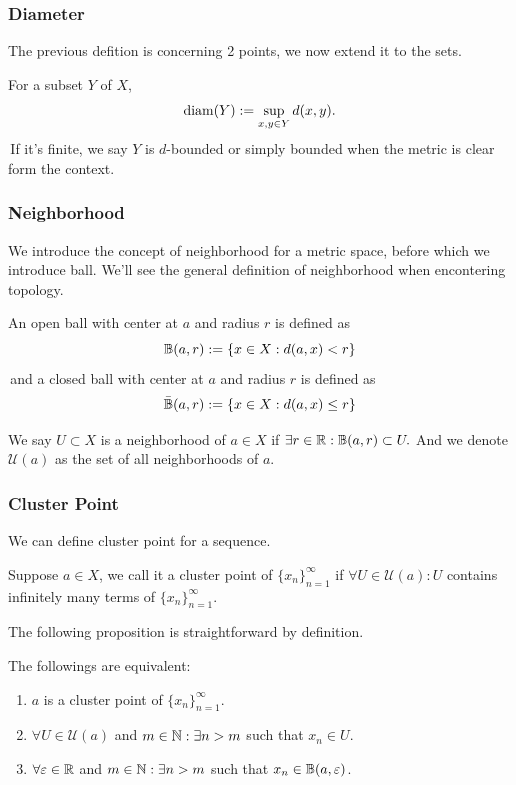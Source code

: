 \subsubsection{Diameter}
The previous defition is concerning 2 points, we now extend it to the sets.
\begin{definition}[Diameter]
    For a subset $Y$ of $X$,
    $$\operatorname{diam}(Y) := \sup_{x,y \in Y} d(x,y).$$
    \,If it's finite, we say $Y$ is $d$-bounded or simply bounded when the metric is clear form the context.
\end{definition}


\subsubsection{Neighborhood}
We introduce the concept of neighborhood for a metric space, before which we introduce ball. We'll see the general definition of neighborhood when encontering topology.
\begin{definition}[Ball]
    An open ball with center at $a$ and radius $r$ is defined as $$\mathbb{B}(a,r):= \{x\in X : d(a,x) < r\}$$
    \,and a closed ball with center at $a$ and radius $r$ is defined as $$\bar{\mathbb{B}}(a,r):= \{x\in X : d(a,x) \leq r\}$$
\end{definition}

\begin{definition}[Neighborhood]
    We say $U\subset X$ is a neighborhood of $a\in X$ if $\exists r \in \mathbb{R} : \mathbb{B}(a,r)\subset U.$ And we denote $\mathcal{U}(a)$ as the set of all neighborhoods of $a$.
\end{definition}

\subsubsection{Cluster Point}
We can define cluster point for a sequence.
\begin{definition}
    Suppose $a\in X$, we call it a cluster point of $\{x_n\}_{n=1}^{\infty}$ if $\forall U \in \mathcal{U}(a): U$ contains infinitely many terms of $\{x_n\}_{n=1}^{\infty}$.
\end{definition}

The following proposition is straightforward by definition.
\begin{proposition}
    The followings are equivalent:
    \begin{enumerate}
        \item $a$ is a cluster point of $\{x_n\}_{n=1}^{\infty}$.
        \item $\forall U\in \mathcal{U}(a)$ and $m\in \mathbb{N}: \exists n>m$ such that $x_n\in U$.
        \item $\forall \varepsilon \in \mathbb{R}$ and $m\in \mathbb{N}: \exists n>m$ such that $x_n\in \mathbb{B}(a,\varepsilon)$.
    \end{enumerate}
\end{proposition}

